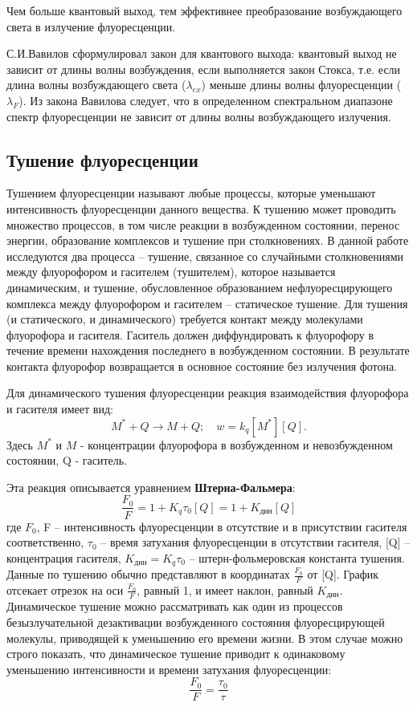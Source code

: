 \documentclass[a4paper,12pt]{article}
\begin{document}
Чем больше квантовый выход, тем эффективнее преобразование возбуждающего
света в излучение флуоресценции.

С.И.Вавилов сформулировал закон для квантового выхода: квантовый выход не
зависит от длины волны возбуждения, если выполняется закон Стокса, т.е. если длина волны
возбуждающего света ($\lambda_{ex}$) меньше длины волны флуоресценции ($\lambda_F$). Из закона Вавилова
следует, что в определенном спектральном диапазоне
спектр флуоресценции не зависит от длины волны возбуждающего излучения.
\subsection*{Тушение флуоресценции}
Тушением флуоресценции называют любые процессы, которые
уменьшают интенсивность флуоресценции данного вещества. К тушению может проводить
множество процессов, в том числе реакции в возбужденном состоянии, перенос энергии,
образование комплексов и тушение при столкновениях. В данной работе исследуются два
процесса – тушение, связанное со случайными столкновениями между флуорофором и
гасителем (тушителем), которое называется динамическим, и тушение, обусловленное
образованием нефлуоресцирующего комплекса между флуорофором и гасителем –
статическое тушение. Для тушения (и статического, и динамического) требуется контакт
между молекулами флуорофора и гасителя. Гаситель должен диффундировать к флуорофору
в течение времени нахождения последнего в возбужденном состоянии. В результате
контакта флуорофор возвращается в основное состояние без излучения фотона.

Для динамического тушения флуоресценции реакция взаимодействия флуорофора и
гасителя имеет вид:
\begin{equation}
    M^* + Q \rightarrow M + Q; \quad w = k_q [M^*][Q].
\end{equation}
Здесь $M^*$ и $M$ - концентрации флуорофора в возбужденном и невозбужденном состоянии, Q - гаситель.

Эта реакция описывается уравнением \textbf{Штерна-Фальмера}:
\begin{equation}
    \frac{F_0}{F} = 1 + K_q \tau_0 [Q] = 1 + K_\text{дин}[Q]
\end{equation}
где $F_0$, F – интенсивность флуоресценции в отсутствие и в присутствии гасителя
соответственно, $\tau_0$ – время затухания флуоресценции в отсутствии гасителя, [Q] –
концентрация гасителя, $K_\text{дин} = K_q \tau_0$ – штерн-фольмеровская константа тушения. Данные по
тушению обычно представляют в координатах $\frac{F_0}{F}$ от [Q]. График отсекает отрезок на оси
$\frac{F_0}{F}$, равный 1, и имеет наклон, равный $K_\text{дин}$. 
Динамическое тушение можно рассматривать как один из процессов
безызлучательной дезактивации возбужденного состояния флуоресцирующей молекулы,
приводящей к уменьшению его времени жизни. В этом случае можно строго показать, что
динамическое тушение приводит к одинаковому уменьшению интенсивности и времени
затухания флуоресценции:
\begin{equation}
    \frac{F_0}{F} = \frac{\tau_0}{\tau}
\end{equation}
\end{document}
